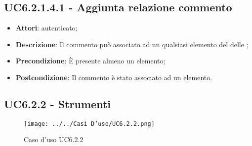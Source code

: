 \subsection{UC6.2.1.4.1 - Aggiunta relazione commento}
\label{ssec:UC6.2.1.4.1}
\begin{itemize}
\item \textbf{Attori}:  autenticato;
\item \textbf{Descrizione}: Il commento può associato ad un qualsiasi elemento del  delle ;
\item \textbf{Precondizione}: È presente almeno un elemento;
\item \textbf{Postcondizione}: Il commento è stato associato ad un elemento.
\end{itemize}
\subsection{UC6.2.2 - Strumenti }
\label{ssec:UC6.2.2}
\begin{figure}[H]
\centering
\texttt{[image: ../../Casi D'uso/UC6.2.2.png]}
\caption{Caso d'uso UC6.2.2}
 \end{figure}
